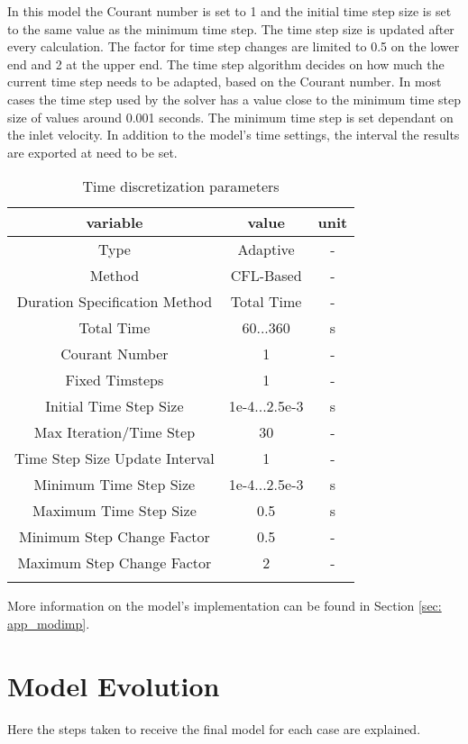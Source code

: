\documentclass[../thesis.tex]{subfiles}
\begin{document}
In this model the Courant number is set to 1 and the initial time step size is set to the same value as the minimum time step. The time step size is updated after every calculation. The factor for time step changes are limited to 0.5 on the lower end and 2 at the upper end. The time step algorithm decides on how much the current time step needs to be adapted, based on the Courant number. In most cases the time step used by the solver has a value close to the minimum time step size of values around 0.001 seconds. The minimum time step is set dependant on the inlet velocity. In addition to the model's time settings, the interval the results are exported at need to be set.
\begin{table} [htb]
	\centering
	\caption{Time discretization parameters}
	\begin{tabular}{ ccc }
		\hline
		variable & value & unit \\
		\hline
		Type & Adaptive & - \\
		Method & CFL-Based & - \\
		Duration Specification Method & Total Time & -\\
		Total Time & 60...360 & s \\
		Courant Number & 1 & - \\
		Fixed Timsteps & 1 & - \\
		Initial Time Step Size & 1e-4...2.5e-3 & s \\
		Max Iteration/Time Step & 30 & - \\
		Time Step Size Update Interval & 1 & - \\
		Minimum Time Step Size & 1e-4...2.5e-3 & s \\
		Maximum Time Step Size & 0.5 & s \\
		Minimum Step Change Factor & 0.5 & - \\
		Maximum Step Change Factor & 2 & - \\		
		\hline
		\label{tab:ansys_setup_time}
	\end{tabular}
\end{table}
More information on the model's implementation can be found in Section \ref{sec: app_modimp}.

\section{Model Evolution}
\label{sec: mod_evol}

Here the steps taken to receive the final model for each case are explained.
\end{document}
